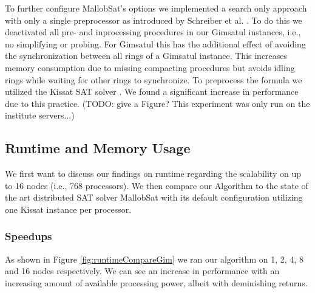 \documentclass[12pt,a4paper,twoside]{scrartcl}
\numberwithin{equation}{section}
\begin{document}
To further configure MallobSat's options we implemented a search only approach with only a single preprocessor as introduced by Schreiber et al. \cite{searchOnlyPaper}. To do this we deactivated all pre- and inprocessing procedures in our Gimsatul instances, i.e., no simplifying or probing. For Gimsatul this has the additional effect of avoiding the synchronization between all rings of a Gimsatul instance. This increases memory consumption due to missing compacting procedures but avoids idling rings while waiting for other rings to synchronize. To preprocess the formula we utilized the Kissat SAT solver \cite{kissat}. We found a significant increase in performance due to this practice. (TODO: give a Figure? This experiment was only run on the institute servers...)

\subsection{Runtime and Memory Usage}

We first want to discuss our findings on runtime regarding the scalability on up to 16 nodes (i.e., 768 processors). We then compare our Algorithm to the state of the art distributed SAT solver MallobSat with its default configuration utilizing one Kissat instance per processor.

\subsubsection{Speedups}

As shown in Figure \ref{fig:runtimeCompareGim} we ran our algorithm on 1, 2, 4, 8 and 16 nodes respectively. We can see an increase in performance with an increasing amount of available processing power, albeit with deminishing returns.
\end{document}

